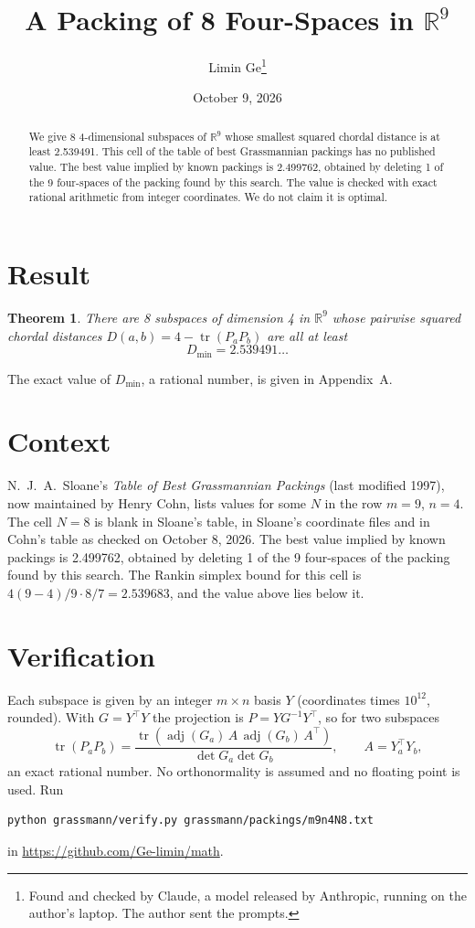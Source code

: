 \documentclass[11pt,a4paper]{article}
\title{A Packing of 8 Four-Spaces in $\mathbb{R}^{9}$}
\author{Limin Ge\thanks{Found and checked by Claude, a model released by Anthropic, running on the author's laptop. The author sent the prompts.}}
\date{October 9, 2026}
\newtheorem*{theorem}{Theorem}
\begin{document}
\maketitle
\begin{abstract}
We give 8 4-dimensional subspaces of $\mathbb{R}^{9}$ whose smallest squared chordal distance is at least 2.539491. This cell of the table of best Grassmannian packings has no published value. The best value implied by known packings is 2.499762, obtained by deleting 1 of the 9 four-spaces of the packing found by this search. The value is checked with exact rational arithmetic from integer coordinates. We do not claim it is optimal.
\end{abstract}

\section{Result}
\begin{theorem}
There are 8 subspaces of dimension 4 in $\mathbb{R}^{9}$ whose pairwise squared chordal distances $D(a,b) = 4 - \operatorname{tr}(P_aP_b)$ are all at least
\[ D_{\min} = 2.539491\ldots \]
\end{theorem}
The exact value of $D_{\min}$, a rational number, is given in Appendix~A.


\section{Context}
N.~J.~A.~Sloane's \emph{Table of Best Grassmannian Packings} (last modified 1997), now maintained by Henry Cohn, lists values for some $N$ in the row $m=9$, $n=4$. The cell $N=8$ is blank in Sloane's table, in Sloane's coordinate files and in Cohn's table as checked on October 8, 2026. The best value implied by known packings is 2.499762, obtained by deleting 1 of the 9 four-spaces of the packing found by this search. The Rankin simplex bound for this cell is $4(9-4)/9\cdot 8/7 = 2.539683$, and the value above lies below it.


\section{Verification}
Each subspace is given by an integer $m\times n$ basis $Y$ (coordinates times $10^{12}$, rounded). With $G=Y^\top Y$ the projection is $P=YG^{-1}Y^\top$, so for two subspaces
\[ \operatorname{tr}(P_aP_b)=\frac{\operatorname{tr}(\operatorname{adj}(G_a)\,A\,\operatorname{adj}(G_b)\,A^\top)}{\det G_a\det G_b},\qquad A=Y_a^\top Y_b, \]
an exact rational number. No orthonormality is assumed and no floating point is used. Run
\begin{verbatim}
python grassmann/verify.py grassmann/packings/m9n4N8.txt
\end{verbatim}
in \url{https://github.com/Ge-limin/math}.
\end{document}
